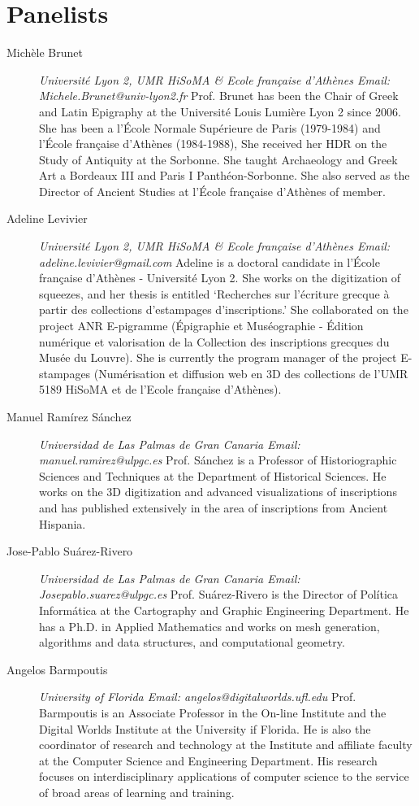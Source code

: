 \documentclass[amsthm,ebook]{saparticle}
\begin{document}
\section{Panelists}
\begin{description}
\item[Michèle Brunet]  \emph{Université Lyon 2, UMR HiSoMA \& Ecole française 
d'Athènes  Email: Michele.Brunet@univ-lyon2.fr} Prof. Brunet has been the Chair of Greek and Latin Epigraphy at the
Université Louis Lumière Lyon 2 since 2006. She has been a
l'École Normale Supérieure de Paris (1979-1984) and l'École française d'Athènes (1984-1988), She received her HDR on the Study of Antiquity at the Sorbonne. She taught Archaeology and Greek Art a Bordeaux III and Paris I Panthéon-Sorbonne. She also served as the Director of Ancient Studies at l’École française d'Athènes of member.
\item[Adeline Levivier] \emph{Université Lyon 2, UMR HiSoMA & Ecole française d’Athènes Email: adeline.levivier@gmail.com} Adeline is a doctoral candidate in l’École française d'Athènes - Université Lyon 2. She works on the digitization of squeezes, and her thesis is entitled ‘Recherches sur l'écriture grecque à partir des collections d'estampages d'inscriptions.’ She collaborated on the project ANR E-pigramme (Épigraphie et Muséographie - Édition numérique et valorisation de la Collection des inscriptions grecques du Musée du Louvre). She is currently the program manager of the project E-  stampages (Numérisation et diffusion web en 3D des collections de  l'UMR 5189 HiSoMA et de l'Ecole française d'Athènes).


\item[Manuel Ramírez Sánchez] \emph{Universidad de Las Palmas de Gran Canaria Email: manuel.ramirez@ulpgc.es} Prof. Sánchez is a Professor of Historiographic Sciences and Techniques at the Department of Historical Sciences. He works on the 3D digitization and advanced visualizations of inscriptions and has published extensively in the area of inscriptions from Ancient Hispania.

\item[Jose-Pablo Suárez-Rivero] \emph{Universidad de Las Palmas de Gran Canaria Email: Josepablo.suarez@ulpgc.es} Prof. Suárez-Rivero is the Director of Política Informática at the Cartography and Graphic Engineering Department. He has a Ph.D. in Applied Mathematics and works on mesh generation, algorithms and data structures, and computational geometry.

\item[Angelos Barmpoutis] \emph{University of Florida Email: angelos@digitalworlds.ufl.edu} Prof. Barmpoutis is an Associate Professor in the On-line Institute and the Digital Worlds Institute at the University if Florida. He is also the coordinator of research and technology at the Institute and affiliate faculty at the Computer Science and Engineering Department. His research focuses on interdisciplinary applications of computer science to the service of broad areas of learning and training.
\end{description}
\end{document}
